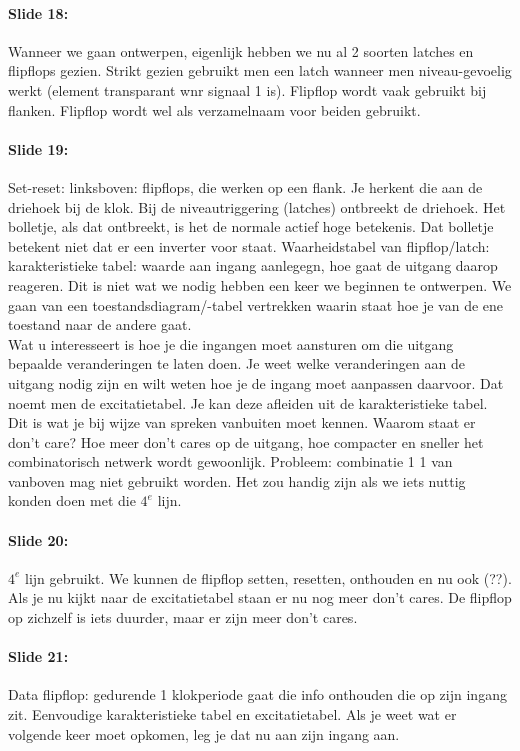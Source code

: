 \documentclass[10pt,a4paper]{book}
\begin{document}
\paragraph{Slide 18:} Wanneer we gaan ontwerpen, eigenlijk hebben we nu al 2 soorten latches en flipflops gezien. Strikt gezien gebruikt men een latch wanneer men niveau-gevoelig werkt (element transparant wnr signaal 1 is). Flipflop wordt vaak gebruikt bij flanken. Flipflop wordt wel als verzamelnaam voor beiden gebruikt.

\paragraph{Slide 19:} Set-reset: linksboven: flipflops, die werken op een flank. Je herkent die aan de driehoek bij de klok. Bij de niveautriggering (latches) ontbreekt de driehoek. Het bolletje, als dat ontbreekt, is het de normale actief hoge betekenis. Dat bolletje betekent niet dat er een inverter voor staat. Waarheidstabel van flipflop/latch: karakteristieke tabel: waarde aan ingang aanlegegn, hoe gaat de uitgang daarop reageren. Dit is niet wat we nodig hebben een keer we beginnen te ontwerpen. We gaan van een toestandsdiagram/-tabel vertrekken waarin staat hoe je van de ene toestand naar de andere gaat.\\
Wat u interesseert is hoe je die ingangen moet aansturen om die uitgang bepaalde veranderingen te laten doen. Je weet welke veranderingen aan de uitgang nodig zijn en wilt weten hoe je de ingang moet aanpassen daarvoor. Dat noemt men de excitatietabel. Je kan deze afleiden uit de karakteristieke tabel. Dit is wat je bij wijze van spreken vanbuiten moet kennen. Waarom staat er don't care? Hoe meer don't cares op de uitgang, hoe compacter en sneller het combinatorisch netwerk wordt gewoonlijk. Probleem: combinatie 1 1 van vanboven mag niet gebruikt worden. Het zou handig zijn als we iets nuttig konden doen met die $4^e$ lijn.

\paragraph{Slide 20:} $4^e$ lijn gebruikt. We kunnen de flipflop setten, resetten, onthouden en nu ook (??).\\
Als je nu kijkt naar de excitatietabel staan er nu nog meer don't cares. De flipflop op zichzelf is iets duurder, maar er zijn meer don't cares.

\paragraph{Slide 21:} Data flipflop: gedurende 1 klokperiode gaat die info onthouden die op zijn ingang zit. Eenvoudige karakteristieke tabel en excitatietabel. Als je weet wat er volgende keer moet opkomen, leg je dat nu aan zijn ingang aan. 
\end{document}
